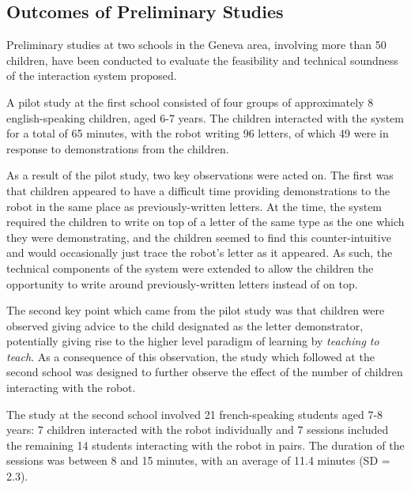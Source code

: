 \documentclass{sig-alternate}
\begin{document}
\subsection{Outcomes of Preliminary Studies}

Preliminary studies at two schools in the Geneva area, involving more than 50 children, 
have been conducted to evaluate the feasibility and technical soundness of the 
interaction system proposed. 

A pilot study at the first school consisted of four groups of
approximately 8 english-speaking children, aged 6-7 years. The children
interacted with the system for a total of 65 minutes, with the robot writing 96
letters, of which 49 were in response to demonstrations from the children. 

As a result of the pilot study, two key observations were acted on. The first
was that children appeared to have a difficult time providing demonstrations to
the robot in the same place as previously-written letters. At the time, the
system required the children to write on top of a letter of the same type as the
one which they were demonstrating, and the children seemed to find this
counter-intuitive and would occasionally just trace the robot's letter as it
appeared. As such, the technical components of the system were extended to allow
the children the opportunity to write around previously-written letters instead
of on top. 

The second key point which came from the pilot study was that children were
observed giving advice to the child designated as the letter demonstrator,
potentially giving rise to the higher level paradigm of learning by
\emph{teaching to teach}. As a consequence of this observation, the study which
followed at the second school was designed to further observe the effect of the
number of children interacting with the robot.

The study at the second school involved 21 french-speaking students aged 7-8 years: 7 children
interacted with the robot individually and 7 sessions included the remaining
14 students interacting with the robot in pairs. The duration of the sessions
was between 8 and 15 minutes, with an average of 11.4 minutes (SD = 2.3). %
%
%
\end{document}
